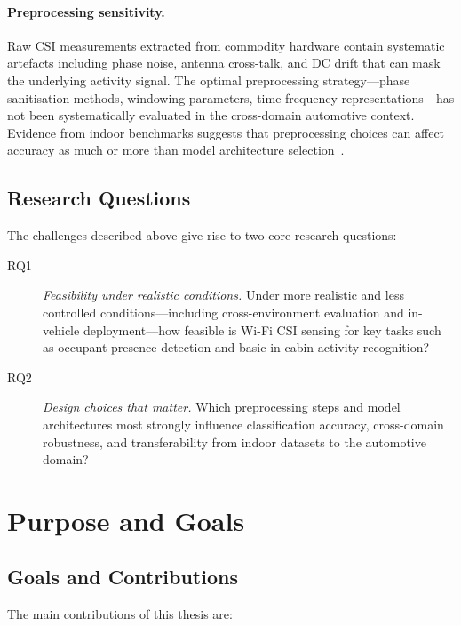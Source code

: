 \documentclass[english,bibtex]{kththesis}
\begin{document}
\paragraph{Preprocessing sensitivity.}
%
Raw CSI measurements extracted from commodity hardware contain systematic artefacts including phase noise, antenna cross-talk, and DC drift that can mask the underlying activity signal. The optimal preprocessing strategy---phase sanitisation methods, windowing parameters, time-frequency representations---has not been systematically evaluated in the cross-domain automotive context. Evidence from indoor benchmarks suggests that preprocessing choices can affect accuracy as much or more than model architecture selection~\cite{zhang2021widar3,yang2023sensefi}.

\subsection{Research Questions}
\label{sec:rq}

The challenges described above give rise to two core research questions:

\begin{description}
  \item[RQ1] \textit{Feasibility under realistic conditions.} Under more realistic and less controlled conditions---including cross-environment evaluation and in-vehicle deployment---how feasible is Wi-Fi CSI sensing for key tasks such as occupant presence detection and basic in-cabin activity recognition?
  \item[RQ2] \textit{Design choices that matter.} Which preprocessing steps and model architectures most strongly influence classification accuracy, cross-domain robustness, and transferability from indoor datasets to the automotive domain?
\end{description}

\section{Purpose and Goals}
\label{sec:goals}

\subsection{Goals and Contributions}
\label{sec:contributions}

The main contributions of this thesis are:
\end{document}
